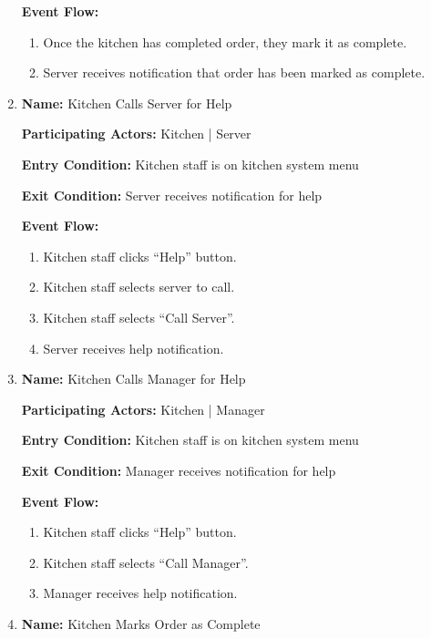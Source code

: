 \documentclass[11pt]{article}
\begin{document}
\begin{enumerate}
			\textbf{Event Flow:}
			\begin{enumerate}
				\setlength{\leftskip}{1cm}
				\item Once the kitchen has completed order, they mark it as complete.
				\item Server receives notification that order has been marked as complete.\\
			\end{enumerate}

		\newpage

		\item \textbf{Name:} 				Kitchen Calls Server for Help

			\textbf{Participating Actors:} 	Kitchen | Server

			\textbf{Entry Condition:} 		Kitchen staff is on kitchen system menu

			\textbf{Exit Condition:} 		Server receives notification for help

			\textbf{Event Flow:}
			\begin{enumerate}
				\setlength{\leftskip}{1cm}
				\item Kitchen staff clicks ``Help'' button.
				\item Kitchen staff selects server to call.
				\item Kitchen staff selects ``Call Server''.
				\item Server receives help notification.\\
			\end{enumerate}

		\item \textbf{Name:} 				Kitchen Calls Manager for Help

			\textbf{Participating Actors:} 	Kitchen | Manager

			\textbf{Entry Condition:} 		Kitchen staff is on kitchen system menu

			\textbf{Exit Condition:} 		Manager receives notification for help

			\textbf{Event Flow:}
			\begin{enumerate}
				\setlength{\leftskip}{1cm}
				\item Kitchen staff clicks ``Help'' button.
				\item Kitchen staff selects ``Call Manager''.
				\item Manager receives help notification.\\
			\end{enumerate}

		\item \textbf{Name:} 				Kitchen Marks Order as Complete


\end{enumerate}
\end{document}
